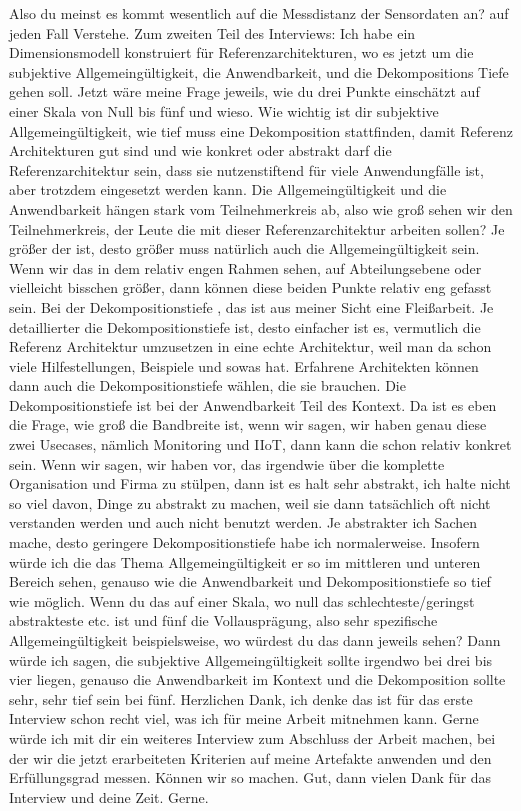 \LF	 Also du meinst es kommt wesentlich auf die Messdistanz der Sensordaten an?
\PA	 auf jeden Fall
\LF	 Verstehe. Zum zweiten Teil des Interviews: Ich habe ein Dimensionsmodell konstruiert für Referenzarchitekturen, wo es jetzt um die subjektive Allgemeingültigkeit, die Anwendbarkeit, und die Dekompositions Tiefe gehen soll. Jetzt wäre meine Frage jeweils, wie du drei Punkte einschätzt auf einer Skala von Null bis fünf und wieso. Wie wichtig ist dir subjektive Allgemeingültigkeit, wie tief muss eine Dekomposition stattfinden, damit Referenz Architekturen gut sind und wie konkret oder abstrakt darf die Referenzarchitektur sein, dass sie nutzenstiftend für viele Anwendungfälle ist, aber trotzdem eingesetzt werden kann.
\PA	 Die Allgemeingültigkeit und die Anwendbarkeit hängen stark vom Teilnehmerkreis ab, also wie groß sehen wir den Teilnehmerkreis, der Leute die mit dieser Referenzarchitektur arbeiten sollen? Je größer der ist, desto größer muss natürlich auch die Allgemeingültigkeit sein. Wenn wir das in dem relativ engen Rahmen sehen, auf Abteilungsebene oder vielleicht bisschen größer, dann können diese beiden Punkte relativ eng gefasst sein. Bei der Dekompositionstiefe , das ist aus meiner Sicht eine Fleißarbeit. Je detaillierter die Dekompositionstiefe ist, desto einfacher ist es, vermutlich die Referenz Architektur umzusetzen in eine echte Architektur, weil man da schon viele Hilfestellungen, Beispiele und sowas hat. Erfahrene Architekten können dann auch die Dekompositionstiefe wählen, die sie brauchen. Die Dekompositionstiefe ist bei der Anwendbarkeit Teil des Kontext. Da ist es eben die Frage, wie groß die Bandbreite ist, wenn wir sagen, wir haben genau diese zwei Usecases, nämlich Monitoring und \ac{IIoT}, dann kann die schon relativ konkret sein. Wenn wir sagen, wir haben vor, das irgendwie über die komplette Organisation und Firma zu stülpen, dann ist es halt sehr abstrakt, ich halte nicht so viel davon, Dinge zu abstrakt zu machen, weil sie dann tatsächlich oft nicht verstanden werden und auch nicht benutzt werden. Je abstrakter ich Sachen mache, desto geringere Dekompositionstiefe habe ich normalerweise. Insofern würde ich die das Thema Allgemeingültigkeit er so im mittleren und unteren Bereich sehen, genauso wie die Anwendbarkeit und Dekompositionstiefe so tief wie möglich.
\LF	Wenn du das auf einer Skala, wo null das schlechteste/geringst abstrakteste etc. ist und fünf die Vollausprägung, also sehr spezifische Allgemeingültigkeit beispielsweise, wo würdest du das dann jeweils sehen?
\PA	 Dann würde ich sagen, die subjektive Allgemeingültigkeit sollte irgendwo bei drei bis vier liegen, genauso die Anwendbarkeit im Kontext und die Dekomposition sollte sehr, sehr tief sein bei fünf.
\LF	 Herzlichen Dank, ich denke das ist für das erste Interview schon recht viel, was ich für meine Arbeit mitnehmen kann. Gerne würde ich mit dir ein weiteres Interview zum Abschluss der Arbeit machen, bei der wir die jetzt erarbeiteten Kriterien auf meine Artefakte anwenden und den Erfüllungsgrad messen.
\PA	 Können wir so machen.
\LF	Gut, dann vielen Dank für das Interview und deine Zeit.
\PA	 Gerne.